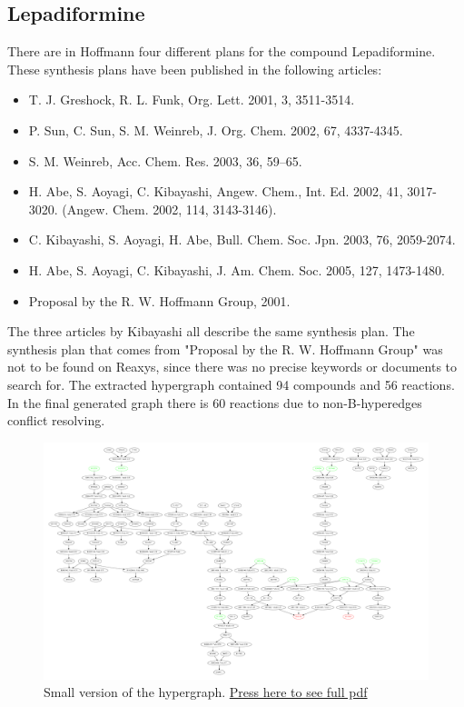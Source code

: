 \documentclass[a4paper,10pt,titlepage]{paper}
\begin{document}
\subsection{Lepadiformine}
There are in Hoffmann\cite{SynthesisPlans} four different plans for the compound Lepadiformine. These synthesis plans have been published in the following articles:
\begin{itemize}
\item
T. J. Greshock, R. L. Funk, Org. Lett. 2001, 3, 3511-3514.
\item
P. Sun, C. Sun, S. M. Weinreb, J. Org. Chem. 2002, 67, 4337-4345.
\item
S. M. Weinreb, Acc. Chem. Res. 2003, 36, 59–65.
\item
H. Abe, S. Aoyagi, C. Kibayashi, Angew. Chem., Int. Ed. 2002, 41, 3017-3020.
(Angew. Chem. 2002, 114, 3143-3146).
\item
C. Kibayashi, S. Aoyagi, H. Abe, Bull. Chem. Soc. Jpn. 2003, 76, 2059-2074.
\item
H. Abe, S. Aoyagi, C. Kibayashi, J. Am. Chem. Soc. 2005, 127, 1473-1480.
\item
Proposal by the R. W. Hoffmann Group, 2001.
\end{itemize}
The three articles by Kibayashi all describe the same synthesis plan. The synthesis plan that comes from "Proposal by the R. W. Hoffmann Group" was not to be found on Reaxys, since there was no precise keywords or documents to search for.
The extracted hypergraph contained 94 compounds and 56 reactions. In the final generated graph there is 60 reactions due to non-B-hyperedges conflict resolving. 

\begin{figure}
\centering
\includegraphics[scale=0.17, angle=90]{Synteseplaner/Lepadiformine/Output.pdf}
\caption{Small version of the hypergraph. \href{Synteseplaner/Lepadiformine/Output.pdf}{Press here to see full pdf}}
\label{fig::LepadiformineGraph}
\end{figure}
\end{document}
